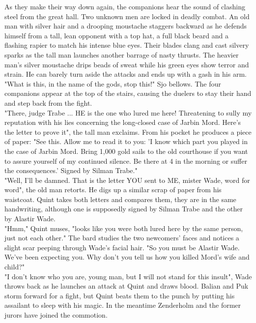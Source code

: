 As they make their way down again, the companions hear the sound of clashing steel from the great hall. Two unknown men are locked in deadly combat. An old man with silver hair and a drooping moustache staggers backward as he defends himself from a tall, lean opponent with a top hat, a full black beard and a flashing rapier to match his intense blue eyes. Their blades clang and cast silvery sparks as the tall man launches another barrage of nasty thrusts. The heavier man's silver moustache drips beads of sweat while his green eyes show terror and strain. He can barely turn aside the attacks and ends up with a gash in his arm.\\

"What is this, in the name of the gods, stop this!" Sjo bellows. The four companions appear at the top of the stairs, causing the duelers to stay their hand and step back from the fight.\\

"There, judge Trabe ... HE is the one who lured me here! Threatening to sully my reputation with his lies concerning the long-closed case of Jarbin Mord. Here's the letter to prove it", the tall man exclaims. From his pocket he produces a piece of paper: "See this. Allow me to read it to you: 'I know which part you played in the case of Jarbin Mord. Bring 1,000 gold sails to the old courthouse if you want to assure yourself of my continued silence. Be there at 4 in the morning or suffer the consequences.' Signed by Silman Trabe."\\

"Well, I'll be damned. That is the letter YOU sent to ME, mister Wade, word for word", the old man retorts. He digs up a similar scrap of paper from his waistcoat. Quint takes both letters and compares them, they are in the same handwriting, although one is supposedly signed by Silman Trabe and the other by Alastir Wade.\\

"Hmm," Quint muses, "looks like you were both lured here by the same person, just not each other." The bard studies the two newcomers' faces and notices a slight scar peeping through Wade's facial hair. "So you must be Alastir Wade. We've been expecting you. Why don't you tell us how you killed Mord's wife and child?"\\

"I don't know who you are, young man, but I will not stand for this insult", Wade throws back as he launches an attack at Quint and draws blood. Balian and Puk storm forward for a fight, but Quint beats them to the punch by putting his assailant to sleep with his magic. In the meantime Zenderholm and the former jurors have joined the commotion.\\

